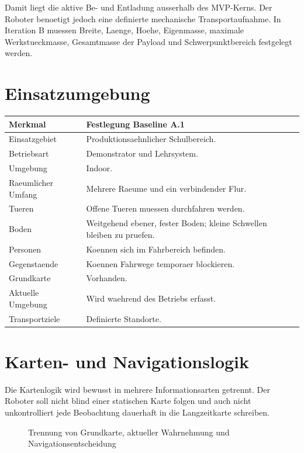 Damit liegt die aktive Be- und Entladung ausserhalb des MVP-Kerns. Der Roboter benoetigt jedoch eine definierte mechanische Transportaufnahme. In Iteration B muessen Breite, Laenge, Hoehe, Eigenmasse, maximale Werkstueckmasse, Gesamtmasse der Payload und Schwerpunktbereich festgelegt werden.

\section{Einsatzumgebung}

\begin{longtable}{L{0.28\textwidth} L{0.56\textwidth}}
\toprule
Merkmal & Festlegung Baseline A.1 \\
\midrule
Einsatzgebiet & Produktionsaehnlicher Schulbereich. \\
Betriebsart & Demonstrator und Lehrsystem. \\
Umgebung & Indoor. \\
Raeumlicher Umfang & Mehrere Raeume und ein verbindender Flur. \\
Tueren & Offene Tueren muessen durchfahren werden. \\
Boden & Weitgehend ebener, fester Boden; kleine Schwellen bleiben zu pruefen. \\
Personen & Koennen sich im Fahrbereich befinden. \\
Gegenstaende & Koennen Fahrwege temporaer blockieren. \\
Grundkarte & Vorhanden. \\
Aktuelle Umgebung & Wird waehrend des Betriebs erfasst. \\
Transportziele & Definierte Standorte. \\
\bottomrule
\end{longtable}

\section{Karten- und Navigationslogik}

Die Kartenlogik wird bewusst in mehrere Informationsarten getrennt. Der Roboter soll nicht blind einer statischen Karte folgen und auch nicht unkontrolliert jede Beobachtung dauerhaft in die Langzeitkarte schreiben.

\begin{figure}[htbp]
  \centering
  \resizebox{\textwidth}{!}{}
  \caption{Trennung von Grundkarte, aktueller Wahrnehmung und Navigationsentscheidung}
  \label{fig:navigation-logic}
\end{figure}

